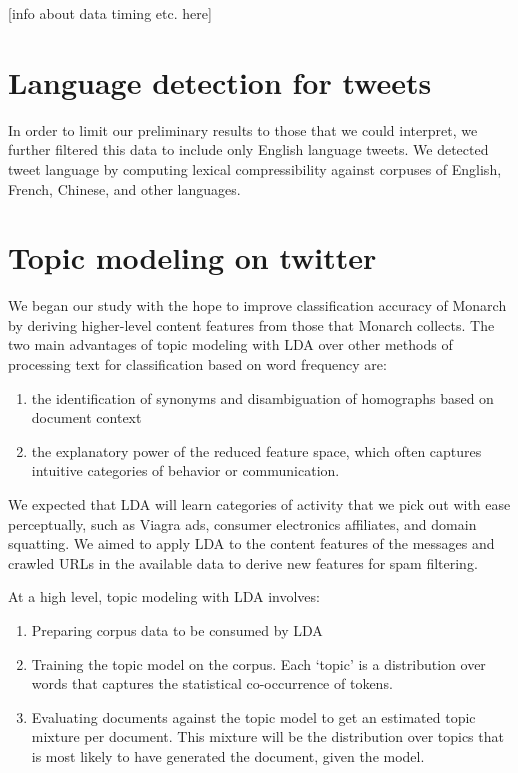 \documentclass[times, 11pt, twocolumn]{article}
\begin{document}
[info about data timing etc. here]

\section{Language detection for tweets}

In order to limit our preliminary results to those that we could interpret, we further filtered this data to include only English language tweets.  We detected tweet language by computing lexical compressibility against corpuses of English, French, Chinese, and other languages.

\section{Topic modeling on twitter}

We began our study with the hope to improve classification accuracy of Monarch by deriving higher-level content features from those that Monarch collects.
The two main advantages of topic modeling with LDA over other methods of processing text for classification based on word frequency are:
\begin{enumerate}
\item the identification of synonyms and disambiguation of homographs based on document context
\item the explanatory power of the reduced feature space, which often captures intuitive categories of behavior or communication. 
\end{enumerate}
We expected that LDA will learn categories of activity that we pick out with ease perceptually, such as Viagra ads, consumer electronics affiliates, and domain squatting.
We aimed to apply LDA to the content features of the messages and crawled URLs in the available data to derive new features for spam filtering.

At a high level, topic modeling with LDA involves:
\begin{enumerate}
\item Preparing corpus data to be consumed by LDA
\item Training the topic model on the corpus.  Each `topic' is a distribution over words that captures the statistical co-occurrence of tokens.
\item Evaluating documents against the topic model to get an estimated topic mixture per document.  This mixture will be the distribution over topics that is most likely to have generated the document, given the model.
\end{enumerate}
\end{document}
